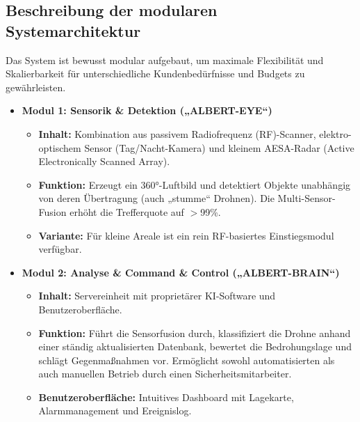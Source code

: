 \documentclass[11pt,a4paper]{article}
\begin{document}
\subsection{Beschreibung der modularen Systemarchitektur}
Das System ist bewusst modular aufgebaut, um maximale Flexibilität und Skalierbarkeit für unterschiedliche Kundenbedürfnisse und Budgets zu gewährleisten.

\begin{itemize}
    \item \textbf{Modul 1: Sensorik \& Detektion („ALBERT-EYE“)}
    \begin{itemize}
        \item \textbf{Inhalt:} Kombination aus passivem Radiofrequenz (RF)-Scanner, elektro-optischem Sensor (Tag/Nacht-Kamera) und kleinem AESA-Radar (Active Electronically Scanned Array).
        \item \textbf{Funktion:} Erzeugt ein 360°-Luftbild und detektiert Objekte unabhängig von deren Übertragung (auch „stumme“ Drohnen). Die Multi-Sensor-Fusion erhöht die Trefferquote auf $>$99\%.
        \item \textbf{Variante:} Für kleine Areale ist ein rein RF-basiertes Einstiegsmodul verfügbar.
    \end{itemize}
    
    \item \textbf{Modul 2: Analyse \& Command \& Control („ALBERT-BRAIN“)}
    \begin{itemize}
        \item \textbf{Inhalt:} Servereinheit mit proprietärer KI-Software und Benutzeroberfläche.
        \item \textbf{Funktion:} Führt die Sensorfusion durch, klassifiziert die Drohne anhand einer ständig aktualisierten Datenbank, bewertet die Bedrohungslage und schlägt Gegenmaßnahmen vor. Ermöglicht sowohl automatisierten als auch manuellen Betrieb durch einen Sicherheitsmitarbeiter.
        \item \textbf{Benutzeroberfläche:} Intuitives Dashboard mit Lagekarte, Alarmmanagement und Ereignislog.
    \end{itemize}
    

\end{itemize}
\end{document}
